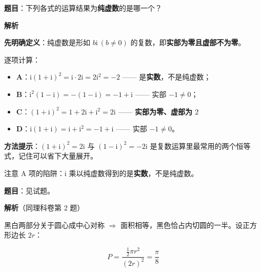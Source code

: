 
\par\medskip


\textbf{题目}：下列各式的运算结果为\textbf{纯虚数}的是哪一个？

\textbf{解析}

\textbf{先明确定义}：纯虚数是形如 $b\mathrm i\ (b\ne0)$ 的复数，即\textbf{实部为零且虚部不为零}。

逐项计算：

\begin{itemize}
\item \textbf{A}：$\mathrm i(1+\mathrm i)^{2}=\mathrm i\cdot2\mathrm i=2\mathrm i^{2}=-2$ —— 是\textbf{实数}，不是纯虚数；
\item \textbf{B}：$\mathrm i^{2}(1-\mathrm i)=-(1-\mathrm i)=-1+\mathrm i$ —— 实部 $-1\ne0$；
\item \textbf{C}：$(1+\mathrm i)^{2}=1+2\mathrm i+\mathrm i^{2}=2\mathrm i$ —— \textbf{实部为零、虚部为 $2$} 
\item \textbf{D}：$\mathrm i(1+\mathrm i)=\mathrm i+\mathrm i^{2}=-1+\mathrm i$ —— 实部 $-1\ne0$。
\end{itemize}


\begin{gktip}
\textbf{方法提示}：$(1+\mathrm i)^{2}=2\mathrm i$ 与 $(1-\mathrm i)^{2}=-2\mathrm i$ 是复数运算里最常用的两个恒等式，记住可以省下大量展开。

注意 A 项的陷阱：$\mathrm i$ 乘以纯虚数得到的是\textbf{实数}，不是纯虚数。
\end{gktip}

\par\medskip


\textbf{题目}：见试题。

\begin{center}\end{center}

\textbf{解析}（同理科卷第 2 题）

黑白两部分关于圆心成中心对称 $\Rightarrow$ 面积相等，黑色恰占内切圆的一半。设正方形边长 $2r$：

\[P=\frac{\frac12\pi r^{2}}{(2r)^{2}}=\frac\pi8\]


\par\medskip

